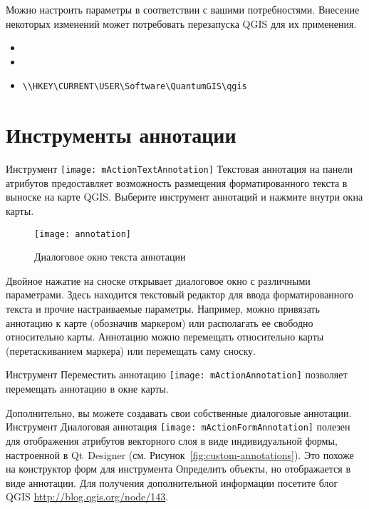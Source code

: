 Можно настроить параметры в соответствии с вашими потребностями. Внесение
некоторых изменений может потребовать перезапуска QGIS для их применения.

\begin{itemize}
\item {}
\item {}
\item {}
\begin{verbatim}
\\HKEY\CURRENT\USER\Software\QuantumGIS\qgis
\end{verbatim}
\end{itemize}

\section{Инструменты аннотации}\label{sec:annotations}

Инструмент \texttt{[image: mActionTextAnnotation]}
Текстовая аннотация на панели атрибутов предоставляет возможность размещения
форматированного текста в выноске на карте QGIS. Выберите инструмент аннотаций
и нажмите внутри окна карты.

\begin{figure}[ht]
   \centering
   \texttt{[image: annotation]}
   \caption{Диалоговое окно текста аннотации \wincaption}
   \label{fig:annotation}
\end{figure}

Двойное нажатие на сноске открывает диалоговое окно с различными параметрами.
Здесь находится текстовый редактор для ввода форматированного текста и прочие
настраиваемые параметры. Например, можно привязать аннотацию к карте
(обозначив маркером) или располагать ее свободно относительно карты. Аннотацию
можно перемещать относительно карты (перетаскиванием маркера) или перемещать
саму сноску.

Инструмент Переместить аннотацию
\texttt{[image: mActionAnnotation]} позволяет
перемещать аннотацию в окне карты.


Дополнительно, вы можете создавать свои собственные диалоговые аннотации.
Инструмент Диалоговая аннотация
\texttt{[image: mActionFormAnnotation]} полезен
для отображения атрибутов векторного слоя в виде индивидуальной формы,
настроенной в Qt~Designer (см. Рисунок~\ref{fig:custom-annotations}).
Это похоже на конструктор форм для инструмента Определить объекты, но
отображается в виде аннотации. Для получения дополнительной информации
посетите блог QGIS \url{http://blog.qgis.org/node/143}.

